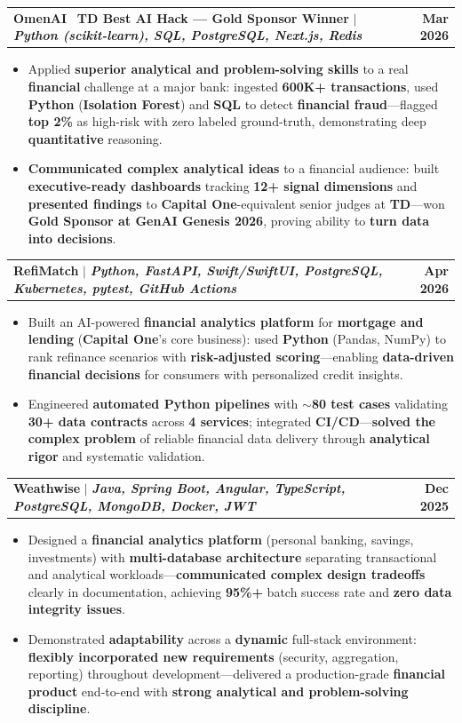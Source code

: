 \documentclass[letterpaper,10pt]{article}
\makeatletter
\newcommand{\resumeItem}[1]{
  \item\small{
    {#1 \vspace{-1pt}}
  }
}
\newcommand{\resumeProjectHeading}[2]{
    \item
    \begin{tabular*}{1.001\textwidth}{l@{\extracolsep{\fill}}r}
      \small#1 & \textbf{\small #2}\\
    \end{tabular*}\vspace{-9pt}
}
\newcommand{\resumeItemListStart}{\begin{itemize}[leftmargin=0.15in]}
\newcommand{\resumeItemListEnd}{\end{itemize}\vspace{-4pt}}
\makeatother
\begin{document}
    \resumeProjectHeading
          {\textbf{OmenAI} \textbar\ \textbf{TD Best AI Hack --- Gold Sponsor Winner} $|$ \emph{\textbf{Python (scikit-learn), SQL, PostgreSQL, Next.js, Redis}}}{Mar 2026}
    \resumeItemListStart
        \resumeItem{Applied \textbf{superior analytical and problem-solving skills} to a real \textbf{financial} challenge at a major bank: ingested \textbf{600K+ transactions}, used \textbf{Python} (\textbf{Isolation Forest}) and \textbf{SQL} to detect \textbf{financial fraud}---flagged \textbf{top 2\%} as high-risk with zero labeled ground-truth, demonstrating deep \textbf{quantitative} reasoning.}
        \vspace{-2pt}
        \resumeItem{\textbf{Communicated complex analytical ideas} to a financial audience: built \textbf{executive-ready dashboards} tracking \textbf{12+ signal dimensions} and \textbf{presented findings} to \textbf{Capital One}-equivalent senior judges at \textbf{TD}---won \textbf{Gold Sponsor at GenAI Genesis 2026}, proving ability to \textbf{turn data into decisions}.}
    \resumeItemListEnd
    \vspace{-18pt}

    \resumeProjectHeading
          {\textbf{RefiMatch} $|$ \emph{\textbf{Python, FastAPI, Swift/SwiftUI, PostgreSQL, Kubernetes, pytest, GitHub Actions}}}{Apr 2026}
          \resumeItemListStart
            \resumeItem{Built an AI-powered \textbf{financial analytics platform} for \textbf{mortgage and lending} (\textbf{Capital One}'s core business): used \textbf{Python} (Pandas, NumPy) to rank refinance scenarios with \textbf{risk-adjusted scoring}---enabling \textbf{data-driven financial decisions} for consumers with personalized credit insights.}
            \vspace{-2pt}
            \resumeItem{Engineered \textbf{automated Python pipelines} with \textbf{$\sim$80 test cases} validating \textbf{30+ data contracts} across \textbf{4 services}; integrated \textbf{CI/CD}---\textbf{solved the complex problem} of reliable financial data delivery through \textbf{analytical rigor} and systematic validation.}
          \resumeItemListEnd
    \vspace{-18pt}

    \resumeProjectHeading
          {\textbf{Weathwise} $|$ \emph{\textbf{Java, Spring Boot, Angular, TypeScript, PostgreSQL, MongoDB, Docker, JWT}}}{Dec 2025}
          \resumeItemListStart
            \resumeItem{Designed a \textbf{financial analytics platform} (personal banking, savings, investments) with \textbf{multi-database architecture} separating transactional and analytical workloads---\textbf{communicated complex design tradeoffs} clearly in documentation, achieving \textbf{95\%+} batch success rate and \textbf{zero data integrity issues}.}
            \vspace{-2pt}
            \resumeItem{Demonstrated \textbf{adaptability} across a \textbf{dynamic} full-stack environment: \textbf{flexibly incorporated new requirements} (security, aggregation, reporting) throughout development---delivered a production-grade \textbf{financial product} end-to-end with \textbf{strong analytical and problem-solving discipline}.}
          \resumeItemListEnd
    \vspace{-8pt}
\end{document}
